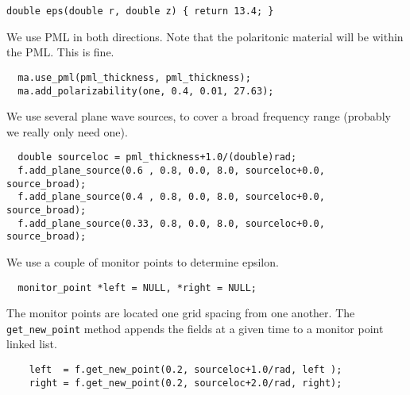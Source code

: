 \begin{verbatim}
double eps(double r, double z) { return 13.4; }
\end{verbatim}
\begin{comment}
double one(double r, double z) { return 1; }

int main(int argc, char **argv) {
  deal_with_ctrl_c();
  const double ttot = 600.0;
  mat ma(eps, rmax + pml_thickness, zsize, rad);
  const char *dirname = make_output_directory(argv[0]);
  printf("Storing output in directory %
  ma.set_output_directory(dirname);
\end{comment}
We use PML in both directions.  Note that the polaritonic material will be
within the PML.  This is fine.
\begin{verbatim}
  ma.use_pml(pml_thickness, pml_thickness);
  ma.add_polarizability(one, 0.4, 0.01, 27.63);
\end{verbatim}
\begin{comment}
  fields f(&ma, m);
\end{comment}
We use several plane wave sources, to cover a broad frequency range
(probably we really only need one).
\begin{verbatim}
  double sourceloc = pml_thickness+1.0/(double)rad;
  f.add_plane_source(0.6 , 0.8, 0.0, 8.0, sourceloc+0.0, source_broad);
  f.add_plane_source(0.4 , 0.8, 0.0, 8.0, sourceloc+0.0, source_broad);
  f.add_plane_source(0.33, 0.8, 0.0, 8.0, sourceloc+0.0, source_broad);
\end{verbatim}
\begin{comment}
  printf("Working on m = %
\end{comment}
We use a couple of monitor points to determine epsilon.
\begin{verbatim}
  monitor_point *left = NULL, *right = NULL;
\end{verbatim}
\begin{comment}
  double next_printtime = 50;
  while (f.time() < ttot && !interrupt) {
    if (f.time() >= next_printtime) {
      next_printtime += 50;
      printf("Working on time %
      printf("energy is %
    }
\end{comment}
The monitor points are located one grid spacing from one another.  The
\verb*|get_new_point| method appends the fields at a given time to a
monitor point linked list.
\begin{verbatim}
    left  = f.get_new_point(0.2, sourceloc+1.0/rad, left );
    right = f.get_new_point(0.2, sourceloc+2.0/rad, right);
\end{verbatim}
